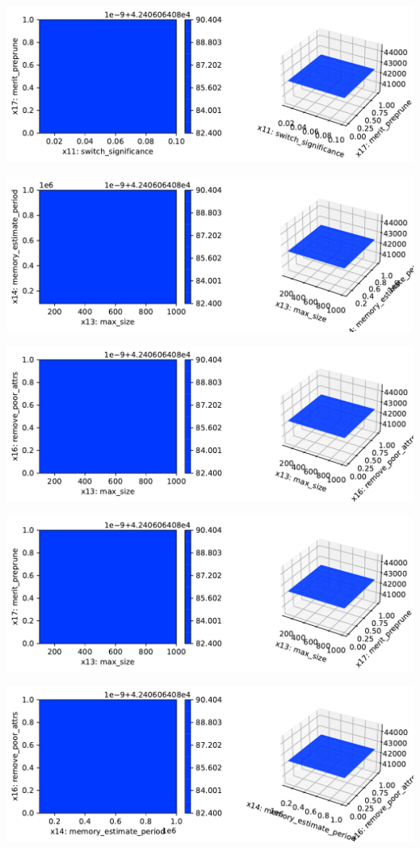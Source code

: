 \documentclass[
  letterpaper,
  DIV=11,
  numbers=noendperiod]{scrreprt}
\begin{document}
\includegraphics{024_spot_hpt_river_friedman_hatr_files/figure-pdf/cell-42-output-100.pdf}

\includegraphics{024_spot_hpt_river_friedman_hatr_files/figure-pdf/cell-42-output-101.pdf}

\includegraphics{024_spot_hpt_river_friedman_hatr_files/figure-pdf/cell-42-output-102.pdf}

\includegraphics{024_spot_hpt_river_friedman_hatr_files/figure-pdf/cell-42-output-103.pdf}

\includegraphics{024_spot_hpt_river_friedman_hatr_files/figure-pdf/cell-42-output-104.pdf}
\end{document}
